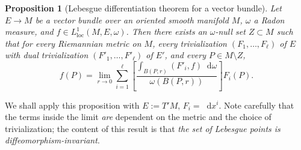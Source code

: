 \documentclass[reqno,11pt]{amsart}
\newcommand*\dif{\mathop{}\!\mathrm{d}}
\newcommand{\loc}{\mathrm{loc}}
\newtheorem{proposition}[theorem]{Proposition}
\theoremstyle{definition}
\numberwithin{equation}{section}
\begin{document}
\begin{proposition}[Lebesgue differentiation theorem for a vector bundle]\label{LebesgueDiff}
Let $E \to M$ be a vector bundle over an oriented smooth manifold $M$, $\omega$ a Radon measure, and $f \in L^1_\loc(M, E, \omega)$.
Then there exists an $\omega$-null set $Z \subset M$ such that for every Riemannian metric on $M$, every trivialization $(F_1, \dots, F_\ell)$ of $E$ with dual trivialization $(F'_1, \dots, F'_\ell)$ of $E'$, and every $P \in M \setminus Z$,
$$f(P) = \lim_{r \to 0} \sum_{i=1}^\ell \left[\frac{\int_{B(P, r)} (F'_i, f) \dif \omega}{\omega(B(P, r))}\right] F_i(P).$$
\end{proposition}

We shall apply this proposition with $E := T'M$, $F_i = \dif x^i$.
Note carefully that the terms inside the limit \emph{are} dependent on the metric and the choice of trivialization; the content of this result is that \emph{the set of Lebesgue points is diffeomorphism-invariant}.
\end{document}
